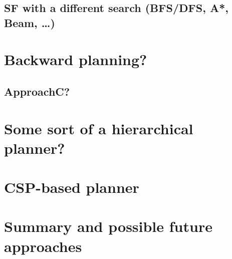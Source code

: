 \subsection{SF with a different search (BFS/DFS, A*, Beam, \ldots)}

\section{Backward planning?}

\subsection{ApproachC?}

\section{Some sort of a hierarchical planner?}

\section{CSP-based planner}\label{csp-approach}


\section{Summary and possible future approaches}



